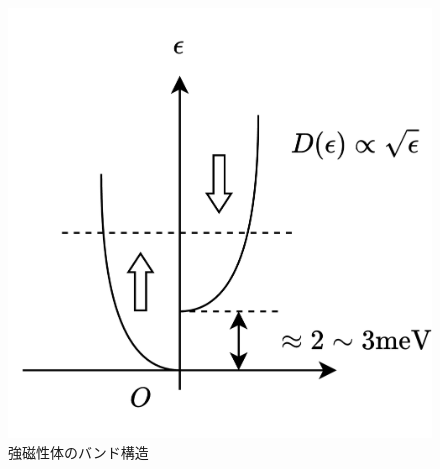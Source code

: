 \begin{figure}
    \centering
    \includegraphics[width=0.5\linewidth]{src/figures/ferromagnetism-band/ferromagnetism-band.png}
    \caption{強磁性体のバンド構造}\label{fig:ferromagnetism-band}
\end{figure}
